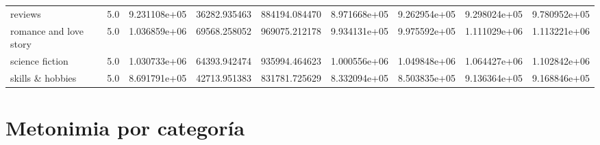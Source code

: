 \documentclass[11pt]{article}
\begin{document}
\begin{tabular}{lrrrrrrrr}
reviews                       &      5.0 &  9.231108e+05 &   36282.935463 &  884194.084470 &  8.971668e+05 &  9.262954e+05 &  9.298024e+05 &  9.780952e+05 \\
romance and love story        &      5.0 &  1.036859e+06 &   69568.258052 &  969075.212178 &  9.934131e+05 &  9.975592e+05 &  1.111029e+06 &  1.113221e+06 \\
science fiction               &      5.0 &  1.030733e+06 &   64393.942474 &  935994.464623 &  1.000556e+06 &  1.049848e+06 &  1.064427e+06 &  1.102842e+06 \\
skills \& hobbies              &      5.0 &  8.691791e+05 &   42713.951383 &  831781.725629 &  8.332094e+05 &  8.503835e+05 &  9.136364e+05 &  9.168846e+05 \\
\bottomrule
\end{tabular}

\section{Metonimia por categoría}
\end{document}

